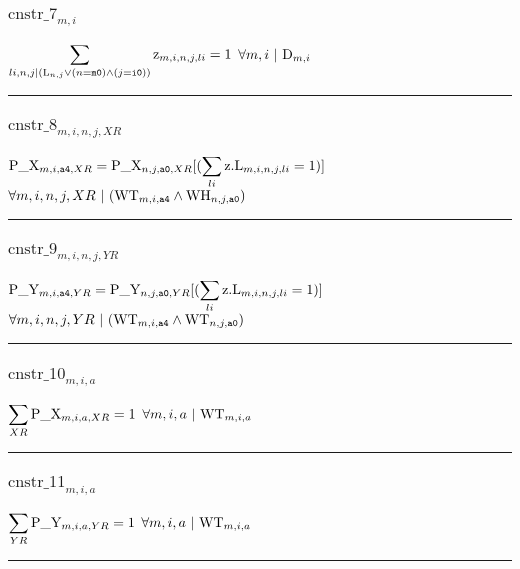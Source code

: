 \documentclass[11pt]{article}
\begin{document}
\subsubsection*{$\text{cnstr\_7}_{m, i}$} \label{cnstr_7}
$
\displaystyle \sum_{li, n, j |  ( \textcolor{black}{\text{L}}_{n, j} \vee  ( n = \texttt{m0}  )  \wedge  ( j = \texttt{i0}  )  )}\textcolor{black}{\text{z}}_{m, i, n, j, li} = 1
$
\hfill
$
\forall{ m, i}  ~ | ~\textcolor{black}{\text{D}}_{m, i}
$ \vspace{5pt}
\hrule 
\subsubsection*{$\text{cnstr\_8}_{m, i, n, j, XR}$} \label{cnstr_8}
$
\textcolor{black}{\text{P\_X}}_{m, i, \texttt{a4}, XR} = \textcolor{black}{\text{P\_X}}_{n, j, \texttt{a0}, XR} [  ( \displaystyle \sum_{li}\textcolor{black}{\text{z.L}}_{m, i, n, j, li}  =  1 )  ] 
$
\hfill
$
\forall{ m, i, n, j, XR}  ~ | ~ ( \textcolor{black}{\text{WT}}_{m, i, \texttt{a4}} \wedge \textcolor{black}{\text{WH}}_{n, j, \texttt{a0}} )
$ \vspace{5pt}
\hrule 
\subsubsection*{$\text{cnstr\_9}_{m, i, n, j, YR}$} \label{cnstr_9}
$
\textcolor{black}{\text{P\_Y}}_{m, i, \texttt{a4}, YR} = \textcolor{black}{\text{P\_Y}}_{n, j, \texttt{a0}, YR} [  ( \displaystyle \sum_{li}\textcolor{black}{\text{z.L}}_{m, i, n, j, li}  =  1 )  ] 
$
\hfill
$
\forall{ m, i, n, j, YR}  ~ | ~ ( \textcolor{black}{\text{WT}}_{m, i, \texttt{a4}} \wedge \textcolor{black}{\text{WT}}_{n, j, \texttt{a0}} )
$ \vspace{5pt}
\hrule 
\subsubsection*{$\text{cnstr\_10}_{m, i, a}$} \label{cnstr_10}
$
\displaystyle \sum_{XR}\textcolor{black}{\text{P\_X}}_{m, i, a, XR} = 1
$
\hfill
$
\forall{ m, i, a}  ~ | ~\textcolor{black}{\text{WT}}_{m, i, a}
$ \vspace{5pt}
\hrule 
\subsubsection*{$\text{cnstr\_11}_{m, i, a}$} \label{cnstr_11}
$
\displaystyle \sum_{YR}\textcolor{black}{\text{P\_Y}}_{m, i, a, YR} = 1
$
\hfill
$
\forall{ m, i, a}  ~ | ~\textcolor{black}{\text{WT}}_{m, i, a}
$ \vspace{5pt}
\hrule 
\end{document}
